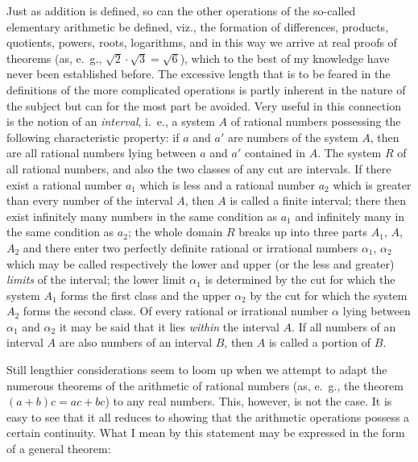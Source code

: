 \documentclass[twoside,openright]{article}
\begin{document}
Just as addition is defined, so can the other operations of the
so-called elementary arithmetic be defined, viz., the formation of
differences, products, quotients, powers, roots, logarithms, and in
this way we arrive at real proofs of theorems (as, e.~g.,
$\sqrt{2}\cdot\sqrt{3} =\sqrt{6}$), which to the best of my knowledge
have never been established before. The excessive length that is to be
feared in the definitions of the more complicated operations is partly
inherent in the nature of the subject but can for the most part be
avoided. Very useful in this connection is the notion of an
\textit{interval}, i.~e., a system $A$ of rational numbers possessing
the following characteristic property: if $a$ and $a'$ are numbers of
the system $A$, then are all rational numbers lying between $a$ and
$a'$ contained in $A$. The system $R$ of all rational numbers, and
also the two classes of any cut are intervals. If there exist a
rational number $a_1$ which is less and a rational number $a_2$ which
is greater than every number of the interval $A$, then $A$ is called a
finite interval; there then exist infinitely many numbers in the same
condition as $a_1$ and infinitely many in the same condition as $a_2$;
the whole domain $R$ breaks up into three parts $A_1$, $A$, $A_2$ and
there enter two perfectly definite rational or irrational numbers
$\alpha_1$, $\alpha_2$ which may be called respectively the lower and
upper (or the less and greater) \textit{limits} of the interval; the
lower limit $\alpha_1$ is determined by the cut for which the system
$A_1$ forms the first class and the upper $\alpha_2$ by the cut for
which the system $A_2$ forms the second class.  Of every rational or
irrational number $\alpha$ lying between $\alpha_1$ and $\alpha_2$ it
may be said that it lies \textit{within} the interval $A$. If all
numbers of an interval $A$ are also numbers of an interval $B$, then
$A$ is called a portion of $B$.

Still lengthier considerations seem to loom up when we attempt to
adapt the numerous theorems of the arithmetic of rational numbers (as,
e.~g., the theorem $(a+b)c=ac+bc$) to any real numbers. This, however,
is not the case. It is easy to see that it all reduces to showing that
the arithmetic operations possess a certain continuity. What I mean by
this statement may be expressed in the form of a general theorem:
\end{document}
